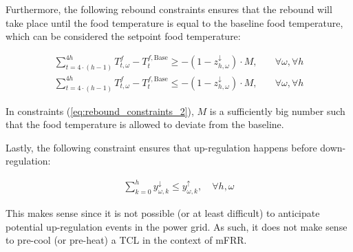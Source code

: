 Furthermore, the following rebound constraints ensures that the rebound will take place until the food temperature is equal to the baseline food temperature, which can be considered the setpoint food temperature:

\begin{subequations}\label{eq:rebound_constraints_2}
    \begin{align}
        \sum_{t=4\cdot(h-1)}^{4 h} T^{f}_{t, \omega} - T^{f, \text{Base}}_{t} \geq - (1 - z^{\downarrow}_{h, \omega}) \cdot M, \quad & \forall{\omega}, \forall{h} \\
        \sum_{t=4\cdot(h-1)}^{4 h} T^{f}_{t, \omega} - T^{f, \text{Base}}_{t} \leq - (1 - z^{\downarrow}_{h, \omega}) \cdot M, \quad & \forall{\omega}, \forall{h}
    \end{align}
\end{subequations}

In constraints (\ref{eq:rebound_constraints_2}), $M$ is a sufficiently big number such that the food temperature is allowed to deviate from the baseline.

Lastly, the following constraint ensures that up-regulation happens before down-regulation:

\begin{align}\label{eq:up_regulation_first}
    \sum_{k=0}^{h} y^{\downarrow}_{\omega, k} \leq y^{\uparrow}_{\omega, k}, \quad \forall{h, \omega}
\end{align}

This makes sense since it is not possible (or at least difficult) to anticipate potential up-regulation events in the power grid. As such, it does not make sense to pre-cool (or pre-heat) a TCL in the context of mFRR.
